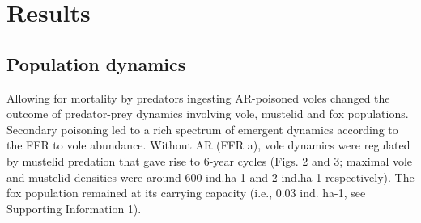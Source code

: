 \documentclass[11pt]{article}
\begin{document}
\section{Results}

\subsection{Population dynamics}

Allowing for mortality by predators ingesting AR-poisoned voles changed the outcome of predator-prey dynamics involving vole, mustelid and fox populations. Secondary poisoning led to a rich spectrum of emergent dynamics according to the FFR to vole abundance.  
Without AR (FFR a), vole dynamics were regulated by mustelid predation that gave rise to 6-year cycles (Figs. 2 and 3; maximal vole and mustelid densities were around 600 ind.ha-1 and 2 ind.ha-1 respectively). The fox population remained at its carrying capacity (i.e., 0.03 ind. ha-1, see Supporting Information 1).  
\end{document}
